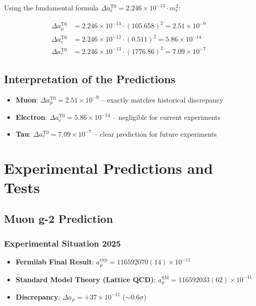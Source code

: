 \documentclass[12pt,a4paper]{article}
\begin{document}
	Using the fundamental formula $\Delta a_\ell^{\mathrm{T0}} = 2.246 \times 10^{-13} \cdot m_\ell^2$:
	
	\begin{align}
		\Delta a_\mu^{\mathrm{T0}} &= 2.246 \times 10^{-13} \cdot (105.658)^2 = 2.51 \times 10^{-9} \\
		\Delta a_e^{\mathrm{T0}} &= 2.246 \times 10^{-13} \cdot (0.511)^2 = 5.86 \times 10^{-14} \\
		\Delta a_\tau^{\mathrm{T0}} &= 2.246 \times 10^{-13} \cdot (1776.86)^2 = 7.09 \times 10^{-7}
	\end{align}
	
	\subsection{Interpretation of the Predictions}
	
	\begin{itemize}
		\item \textbf{Muon}: $\Delta a_\mu^{\mathrm{T0}} = 2.51 \times 10^{-9}$ -- exactly matches historical discrepancy
		\item \textbf{Electron}: $\Delta a_e^{\mathrm{T0}} = 5.86 \times 10^{-14}$ -- negligible for current experiments
		\item \textbf{Tau}: $\Delta a_\tau^{\mathrm{T0}} = 7.09 \times 10^{-7}$ -- clear prediction for future experiments
	\end{itemize}
	
	\section{Experimental Predictions and Tests}
	
	\subsection{Muon g-2 Prediction}
	
	\subsubsection{Experimental Situation 2025}
	\begin{itemize}
		\item \textbf{Fermilab Final Result}: $a_{\mu}^{\mathrm{exp}} = 116592070(14) \times 10^{-11}$ 
		\item \textbf{Standard Model Theory (Lattice QCD)}: $a_{\mu}^{\mathrm{SM}} = 116592033(62) \times 10^{-11}$ 
		\item \textbf{Discrepancy}: $\Delta a_{\mu} = +37 \times 10^{-11}$ ($\sim 0.6\sigma$)
	\end{itemize}
	
\end{document}
